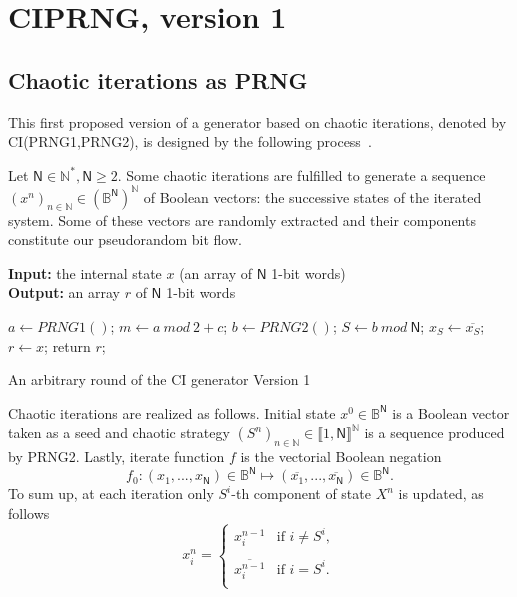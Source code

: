 \section{CIPRNG, version 1~\cite{wang2009}}
\label{Version 1 CI algorithms and examples}
\subsection{Chaotic iterations as PRNG}
\label{subsec Chaotic iterations as PRNG}
This first proposed version of a generator based on chaotic iterations, 
denoted by CI(PRNG1,PRNG2), is designed by the following process~\cite{wang2009}. 

Let $\mathsf{N} \in \mathds{N}^*, \mathsf{N} \geqslant 2$. Some chaotic iterations are fulfilled to generate a sequence $\left(x^n\right)_{n\in\mathds{N}} \in \left(\mathds{B}^\mathsf{N}\right)^\mathds{N}$ of Boolean vectors: the successive states of the iterated system. Some of these vectors are randomly extracted and their components constitute our pseudorandom bit flow.
\begin{algorithm}
\textbf{Input:} the internal state $x$ (an array of $\mathsf{N}$ 1-bit words)\\
\textbf{Output:} an array $r$ of $\mathsf{N}$ 1-bit words
\begin{algorithmic}[1]

\STATE$a\leftarrow{PRNG1()}$;
\STATE$m\leftarrow{a~mod~2+c}$;
\STATE$b\leftarrow{PRNG2()}$;
\STATE$S\leftarrow{b~mod~\mathsf{N}}$;
\STATE$x_S\leftarrow{ \overline{x_S}}$;
\ENDWHILE
\STATE$r\leftarrow{x}$;
\STATE return $r$;
\medskip
\caption{An arbitrary round of the CI generator Version 1}
\label{Chaotic iteration}
\end{algorithmic}
\end{algorithm}

Chaotic iterations are realized as follows. Initial state $x^0 \in \mathds{B}^\mathsf{N}$ is a Boolean vector taken as a seed and chaotic strategy $\left(S^n\right)_{n\in\mathds{N}}\in \llbracket 1, \mathsf{N} \rrbracket^\mathds{N}$ is a sequence produced by PRNG2. Lastly, iterate function $f$ is the vectorial Boolean negation
$$f_0:(x_1,...,x_\mathsf{N}) \in \mathds{B}^\mathsf{N} \longmapsto (\overline{x_1},...,\overline{x_\mathsf{N}}) \in \mathds{B}^\mathsf{N}.$$
To sum up, at each iteration only $S^i$-th component of state $X^n$ is updated, as follows
\begin{equation}
x_i^n = \left\{\begin{array}{ll}x_i^{n-1} & \text{if } i \neq S^i, \\ \\ \overline{x_i^{n-1}} & \text{if } i = S^i. \\\end{array}\right.
\end{equation}

